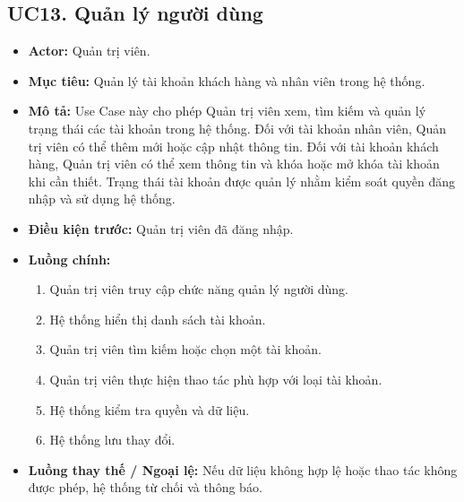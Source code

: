 \documentclass[12pt,a4paper]{article}
\begin{document}

\subsection*{UC13. Quản lý người dùng}

\begin{itemize}

 \item \textbf{Actor:} Quản trị viên.

 \item \textbf{Mục tiêu:} Quản lý tài khoản khách hàng và nhân viên trong hệ thống.

 \item \textbf{Mô tả:} Use Case này cho phép Quản trị viên xem, tìm kiếm và quản lý trạng thái các tài khoản trong hệ thống. Đối với tài khoản nhân viên, Quản trị viên có thể thêm mới hoặc cập nhật thông tin. Đối với tài khoản khách hàng, Quản trị viên có thể xem thông tin và khóa hoặc mở khóa tài khoản khi cần thiết. Trạng thái tài khoản được quản lý nhằm kiểm soát quyền đăng nhập và sử dụng hệ thống.

 \item \textbf{Điều kiện trước:} Quản trị viên đã đăng nhập.

 \item \textbf{Luồng chính:}

 \begin{enumerate}

  \item Quản trị viên truy cập chức năng quản lý người dùng.

  \item Hệ thống hiển thị danh sách tài khoản.

  \item Quản trị viên tìm kiếm hoặc chọn một tài khoản.

  \item Quản trị viên thực hiện thao tác phù hợp với loại tài khoản.

  \item Hệ thống kiểm tra quyền và dữ liệu.

  \item Hệ thống lưu thay đổi.

 \end{enumerate}

 \item \textbf{Luồng thay thế / Ngoại lệ:} Nếu dữ liệu không hợp lệ hoặc thao tác không được phép, hệ thống từ chối và thông báo.


\end{itemize}
\end{document}
